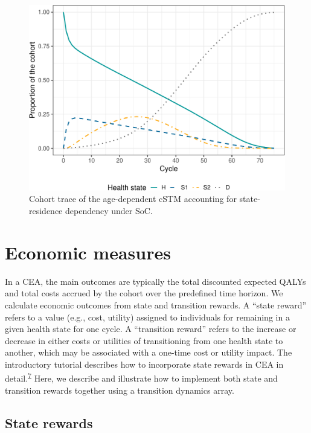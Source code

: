 \documentclass[
]{article}
\begin{document}
\begin{figure}[H]

{\centering \includegraphics{figs/Sick-Sicker-Trace-HistDep-1} 

}

\caption{Cohort trace of the age-dependent cSTM accounting for state-residence dependency under SoC.}\label{fig:Sick-Sicker-Trace-HistDep}
\end{figure}

\hypertarget{economic-measures}{%
\section{Economic measures}\label{economic-measures}}

In a CEA, the main outcomes are typically the total discounted expected QALYs and total costs accrued by the cohort over the predefined time horizon. We calculate economic outcomes from state and transition rewards. A ``state reward'' refers to a value (e.g., cost, utility) assigned to individuals for remaining in a given health state for one cycle. A ``transition reward'' refers to the increase or decrease in either costs or utilities of transitioning from one health state to another, which may be associated with a one-time cost or utility impact. The introductory tutorial describes how to incorporate state rewards in CEA in detail.\textsuperscript{\protect\hyperlink{ref-Alarid-Escudero2021a}{7}} Here, we describe and illustrate how to implement both state and transition rewards together using a transition dynamics array.

\hypertarget{state-rewards}{%
\subsection{State rewards}\label{state-rewards}}
\end{document}

